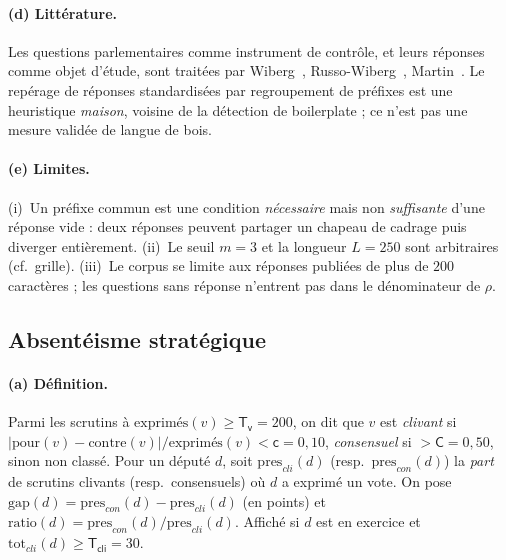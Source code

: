 \documentclass[11pt,a4paper]{article}
\newcommand{\param}[1]{\ensuremath{\mathsf{#1}}}
\begin{document}
\paragraph{(d) Littérature.} Les questions parlementaires comme instrument de
contrôle, et leurs réponses comme objet d'étude, sont traitées par
Wiberg~\cite{wiberg1995}, Russo-Wiberg~\cite{rw2010}, Martin~\cite{martin2011}.
Le repérage de réponses standardisées par regroupement de préfixes est une
heuristique \emph{maison}, voisine de la détection de \og{}boilerplate\fg{} ;
ce n'est pas une mesure validée de \og{}langue de bois\fg{}.

\paragraph{(e) Limites.} (i)~Un préfixe commun est une condition \emph{nécessaire}
mais non \emph{suffisante} d'une réponse \og{}vide\fg{} : deux réponses peuvent
partager un chapeau de cadrage puis diverger entièrement. (ii)~Le seuil $m=3$ et la
longueur $L=250$ sont arbitraires (cf.~grille). (iii)~Le corpus se limite aux
réponses publiées de plus de $200$ caractères ; les questions sans réponse n'entrent
pas dans le dénominateur de $\rho$.

\subsection{Absentéisme stratégique}\label{sec:absence}

\paragraph{(a) Définition.} Parmi les scrutins à $\text{exprimés}(v)\ge \param{T_v}=200$,
on dit que $v$ est \emph{clivant} si
$|\mathrm{pour}(v)-\mathrm{contre}(v)|/\text{exprimés}(v)<\param{c}=0{,}10$,
\emph{consensuel} si $>\param{C}=0{,}50$, sinon non classé. Pour un député $d$, soit
$\mathrm{pres}_{cli}(d)$ (resp.\ $\mathrm{pres}_{con}(d)$) la \emph{part} de
scrutins clivants (resp.\ consensuels) où $d$ a exprimé un vote. On pose
$\mathrm{gap}(d)=\mathrm{pres}_{con}(d)-\mathrm{pres}_{cli}(d)$ (en points) et
$\mathrm{ratio}(d)=\mathrm{pres}_{con}(d)/\mathrm{pres}_{cli}(d)$. Affiché si $d$
est en exercice et $\mathrm{tot}_{cli}(d)\ge \param{T_{cli}}=30$.
\end{document}
